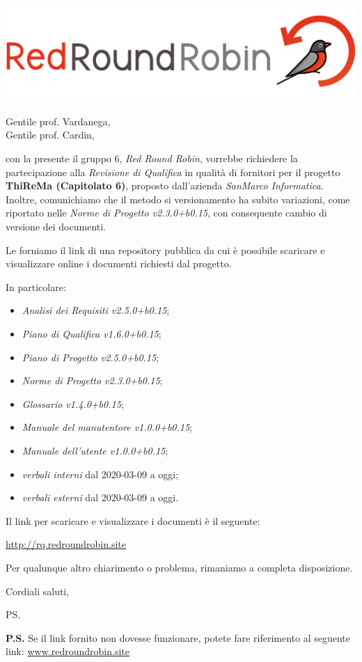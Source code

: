 \documentclass[12pt]{letter}
\date{13 aprile 2020}
\begin{document}
\begin{letter}{ }

\includegraphics[scale=0.17]{images/logo.png}

\opening{Gentile prof. Vardanega,\\ Gentile prof. Cardin, }

con la presente il gruppo 6, \textit{Red Round Robin}, vorrebbe richiedere la partecipazione alla \textit{Revisione di Qualifica} in qualità di fornitori per il progetto \textbf{ThiReMa (Capitolato 6)}, proposto dall'azienda \textit{SanMarco Informatica}. Inoltre, comunichiamo che il metodo si versionamento ha subito variazioni, come riportato nelle \textit{Norme di Progetto v2.3.0+b0.15}, con consequente cambio di versione dei documenti.

Le forniamo il link di una repository pubblica da cui è possibile scaricare e visualizzare online i documenti richiesti dal progetto.

In particolare:

\begin{itemize}
  \item \textit{Analisi dei Requisiti v2.5.0+b0.15};
	\item \textit{Piano di Qualifica v1.6.0+b0.15};
	\item \textit{Piano di Progetto v2.5.0+b0.15};
	\item \textit{Norme di Progetto v2.3.0+b0.15};
	\item \textit{Glossario v1.4.0+b0.15};
	\item \textit{Manuale del manutentore v1.0.0+b0.15};
	\item \textit{Manuale dell'utente v1.0.0+b0.15};
	\item \textit{verbali interni} dal 2020-03-09 a oggi;
	\item \textit{verbali esterni} dal 2020-03-09 a oggi.
\end{itemize}

Il link per scaricare e visualizzare i documenti è il seguente:

\begin{center}
\href{}{http://rq.redroundrobin.site}
\end{center}

\newpage

Per qualunque altro chiarimento o problema, rimaniamo a completa disposizione.

\closing{Cordiali saluti,}


\vspace{3em}
\ps

\textbf{P.S.} Se il link fornito non dovesse funzionare, potete fare riferimento al seguente link:
\href{https://www.redroundrobin.site}{www.redroundrobin.site}

\end{letter}
\end{document}
